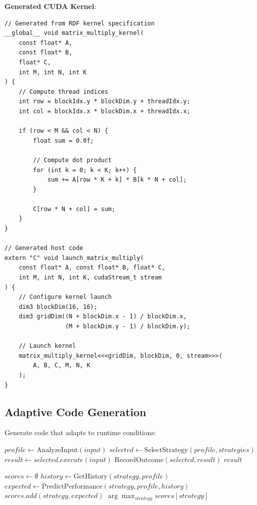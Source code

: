 \textbf{Generated CUDA Kernel}:

\begin{verbatim}
// Generated from RDF kernel specification
__global__ void matrix_multiply_kernel(
    const float* A,
    const float* B,
    float* C,
    int M, int N, int K
) {
    // Compute thread indices
    int row = blockIdx.y * blockDim.y + threadIdx.y;
    int col = blockIdx.x * blockDim.x + threadIdx.x;

    if (row < M && col < N) {
        float sum = 0.0f;

        // Compute dot product
        for (int k = 0; k < K; k++) {
            sum += A[row * K + k] * B[k * N + col];
        }

        C[row * N + col] = sum;
    }
}

// Generated host code
extern "C" void launch_matrix_multiply(
    const float* A, const float* B, float* C,
    int M, int N, int K, cudaStream_t stream
) {
    // Configure kernel launch
    dim3 blockDim(16, 16);
    dim3 gridDim((N + blockDim.x - 1) / blockDim.x,
                 (M + blockDim.y - 1) / blockDim.y);

    // Launch kernel
    matrix_multiply_kernel<<<gridDim, blockDim, 0, stream>>>(
        A, B, C, M, N, K
    );
}
\end{verbatim}

\subsection{Adaptive Code Generation}

Generate code that adapts to runtime conditions:

\begin{algorithm}
\caption{Adaptive Strategy Selection}
\begin{algorithmic}[1]
    \State $profile \gets \text{AnalyzeInput}(input)$ 
    \State $selected \gets \text{SelectStrategy}(profile, strategies)$
    \State $result \gets selected.execute(input)$
    \State $\text{RecordOutcome}(selected, result)$ 
    \State \Return $result$
\EndProcedure

    \State $scores \gets \emptyset$
        \State $history \gets \text{GetHistory}(strategy, profile)$
        \State $expected \gets \text{PredictPerformance}(strategy, profile, history)$
        \State $scores.add(strategy, expected)$
    \EndFor
    \State \Return $\arg\max_{strategy} scores[strategy]$
\EndProcedure
\end{algorithmic}
\end{algorithm}

